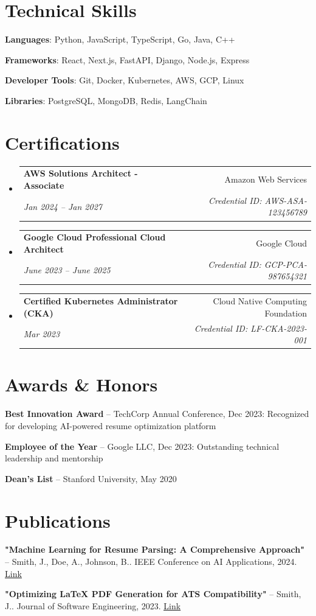 \documentclass[letterpaper,11pt]{article}
\makeatletter
\newcommand{\resumeItem}[1]{
  \item\small{
    {#1 \vspace{-2pt}}
  }
}
\newcommand{\resumeSubheading}[4]{
  \vspace{-2pt}\item
    \begin{tabular*}{0.97\textwidth}[t]{l@{\extracolsep{\fill}}r}
      \textbf{#1} & #2 \\
      \textit{\small#3} & \textit{\small #4} \\
    \end{tabular*}\vspace{-7pt}
}
\newcommand{\resumeSubHeadingListStart}{\begin{itemize}[leftmargin=0.15in, label={}]}
\newcommand{\resumeSubHeadingListEnd}{\end{itemize}}
\makeatother
\begin{document}
\section{Technical Skills}
 \begin{itemize}[leftmargin=0.15in, label={}]
    \small{\item{
    \resumeItem{\textbf{Languages}: Python, JavaScript, TypeScript, Go, Java, C++}
    \resumeItem{\textbf{Frameworks}: React, Next.js, FastAPI, Django, Node.js, Express}
    \resumeItem{\textbf{Developer Tools}: Git, Docker, Kubernetes, AWS, GCP, Linux}
    \resumeItem{\textbf{Libraries}: PostgreSQL, MongoDB, Redis, LangChain}
    }}
 \end{itemize}


\section{Certifications}
  \resumeSubHeadingListStart
    \resumeSubheading
      {AWS Solutions Architect - Associate}{Amazon Web Services}
      {Jan 2024 -- Jan 2027}{Credential ID: AWS-ASA-123456789}
    \resumeSubheading
      {Google Cloud Professional Cloud Architect}{Google Cloud}
      {June 2023 -- June 2025}{Credential ID: GCP-PCA-987654321}
    \resumeSubheading
      {Certified Kubernetes Administrator (CKA)}{Cloud Native Computing Foundation}
      {Mar 2023}{Credential ID: LF-CKA-2023-001}
  \resumeSubHeadingListEnd


\section{Awards \& Honors}
 \begin{itemize}[leftmargin=0.15in, label={}]
    \small{\item{
    \resumeItem{\textbf{Best Innovation Award} -- TechCorp Annual Conference, Dec 2023: Recognized for developing AI-powered resume optimization platform}
    \resumeItem{\textbf{Employee of the Year} -- Google LLC, Dec 2023: Outstanding technical leadership and mentorship}
    \resumeItem{\textbf{Dean's List} -- Stanford University, May 2020}
    }}
 \end{itemize}


\section{Publications}
 \begin{itemize}[leftmargin=0.15in, label={}]
    \small{\item{
    \resumeItem{\textbf{"Machine Learning for Resume Parsing: A Comprehensive Approach"} -- Smith, J., Doe, A., Johnson, B.. IEEE Conference on AI Applications, 2024. \href{https://doi.org/10.1109/example.2024.001}{\underline{Link}}}
    \resumeItem{\textbf{"Optimizing LaTeX PDF Generation for ATS Compatibility"} -- Smith, J.. Journal of Software Engineering, 2023. \href{https://doi.org/10.1234/jse.2023.456}{\underline{Link}}}
    }}
 \end{itemize}
\end{document}
